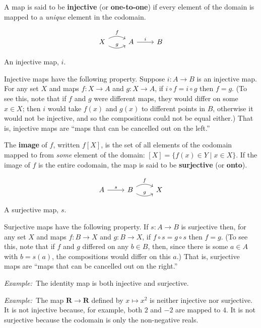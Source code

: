 \documentclass[12pt, a4paper]{article}
\newcommand{\defn}[1]{\textbf{#1}}
\newcommand{\set}[1]{\mathbold{#1}}
\newcommand{\eg}{\emph{Example:}\relax}
\begin{document}
A map is said to be \defn{injective} (or \defn{one-to-one}) if every
element of the domain is mapped to a \emph{unique} element in the
codomain.

\begin{sidefigure}
\[\begin{tikzcd}
  X \arrow[r, bend left, "f"] \arrow [r, bend right, "g"] & A \arrow[r, "i"] & B
\end{tikzcd}\]
  \caption{An injective map, $i$.\label{fig:injection}}
\end{sidefigure}
Injective maps have the following property. Suppose $i\colon A\to B$ is
an injective map. For any set $X$ and maps $f\colon X\to A$ and $g\colon
X\to A$, if $i\circ f = i\circ g$ then $f = g$. (To see this, note that if $f$
and $g$ were different maps, they would differ on some $x \in X$; then
$i$ would take $f(x)$ and $g(x)$ to different points in $B$, otherwise
it would not be injective, and so the compositions could not be equal
either.) That is, injective maps are “maps that can be cancelled out
on the left.”

The \defn{image} of $f$, written $f[X]$, is the set of all elements of
the codomain mapped to from \emph{some} element of the domain: $[X] =
\{f(x) \in Y \mid x\in X\}$. If the image of $f$ is the entire codomain, the
map is said to be \defn{surjective} (or \defn{onto}).

\begin{sidefigure}
\[\begin{tikzcd}
  A \arrow[r, "s"] & B \arrow[r, bend left, "f"] \arrow [r, bend right, "g"] & X 
\end{tikzcd}\]
  \caption{A surjective map, $s$.\label{fig:surjection}}
\end{sidefigure}
Surjective maps have the following property. If $s\colon A\to B$ is
surjective then, for any set $X$ and maps $f\colon B\to X$ and $g\colon
B\to X$, if $f\circ s = g\circ s$ then $f = g$. (To see this, note that if $f$
and $g$ differed on any $b\in B$, then, since there is some $a\in A$ with
$b = s(a)$, the compositions would differ on this $a$.) That is,
surjective maps are “maps that can be cancelled out on the right.”

\eg\ The identity map is both injective and surjective.

\eg\ The map $\set{R}\to\set{R}$ defined by $x\mapsto x^2$ is neither
injective nor surjective. It is not injective because, for example,
both $2$ and $-2$ are mapped to $4$. It is not surjective because the
codomain is only the non-negative reals.
\end{document}
